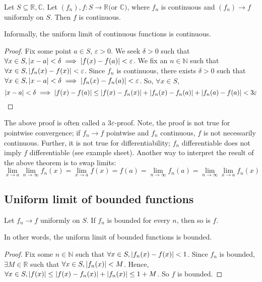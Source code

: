 \begin{theorem}
	Let \( S \subseteq \mathbb R, \mathbb C \).
	Let \( (f_n), f \colon S \to \mathbb R \text{(or } \mathbb{C} \text{)} \), where \( f_n \) is continuous and \( (f_n) \to f \) uniformly on \( S \).
	Then \( f \) is continuous.
\end{theorem}
Informally, the uniform limit of continuous functions is continuous.
\begin{proof}
	Fix some point \( a \in S \), \( \varepsilon > 0 \).
	We seek \( \delta > 0 \) such that \( \forall x \in S, \abs{x - a} < \delta \implies \abs{f(x) - f(a)} < \varepsilon \).
	We fix an \( n \in \mathbb N \) such that \( \forall x \in S, \abs{f_n(x) - f(x)} < \varepsilon \).
	Since \( f_n \) is continuous, there exists \( \delta > 0 \) such that \( \forall x \in S, \abs{x - a} < \delta \implies \abs{f_n(x) - f_n(a)} < \varepsilon \).
	So, \( \forall x \in S \),
	\[
		\abs{x - a} < \delta  \implies \abs{f(x) - f(a)} \leq \abs{f(x) - f_n(x)} + \abs{f_n(x) - f_n(a)} + \abs{f_n(a) - f(a)} < 3\varepsilon
	\]
\end{proof}
\begin{remark}
	The above proof is often called a \( 3\varepsilon \)-proof.
	Note, the proof is not true for pointwise convergence; if \( f_n \to f \) pointwise and \( f_n \) continuous, \( f \) is not necessarily continuous.
	Further, it is not true for differentiability; \( f_n \) differentiable does not imply \( f \) differentiable (see example sheet).
	Another way to interpret the result of the above theorem is to swap limits:
	\[
		\lim_{x \to a} \lim_{n \to \infty} f_n(x) = \lim_{x \to a} f(x) = f(a) = \lim_{n \to \infty} f_n(a) = \lim_{n \to \infty} \lim_{x \to a} f_n(x)
	\]
\end{remark}

\subsection{Uniform limit of bounded functions}
\begin{lemma}
	Let \( f_n \to f \) uniformly on \( S \).
	If \( f_n \) is bounded for every \( n \), then so is \( f \).
\end{lemma}
In other words, the uniform limit of bounded functions is bounded.
\begin{proof}
	Fix some \( n \in \mathbb N \) such that \( \forall x \in S, \abs{f_n(x) - f(x)} < 1 \).
	Since \( f_n \) is bounded, \( \exists M \in \mathbb R \) such that \( \forall x \in S, \abs{f_n(x)} < M \).
	Hence, \( \forall x \in S, \abs{f(x)} \leq \abs{f(x) - f_n(x)} + \abs{f_n(x)} \leq 1 + M \).
	So \( f \) is bounded.
\end{proof}

